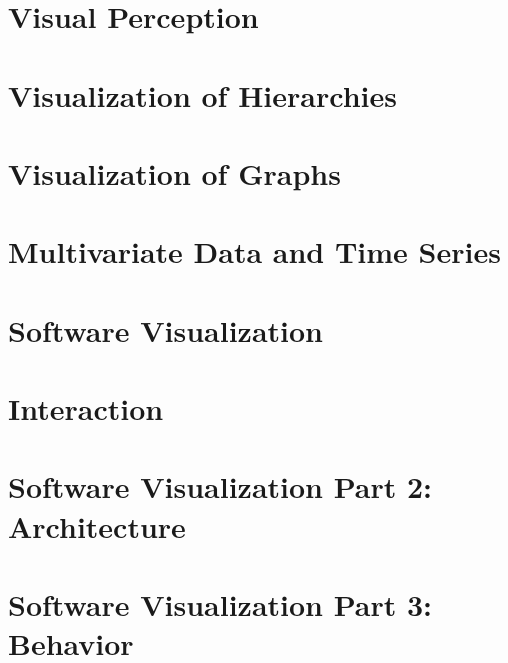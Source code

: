 \documentclass[10pt,a4paper]{article}
\begin{document}
		
		
	\section{Visual Perception}
	\section{Visualization of Hierarchies}
	\section{Visualization of Graphs}
	\section{Multivariate Data and Time Series}
	\section{Software Visualization}
	\section{Interaction}
	\section{Software Visualization Part 2: Architecture}	
	\section{Software Visualization Part 3: Behavior}
\end{document}
